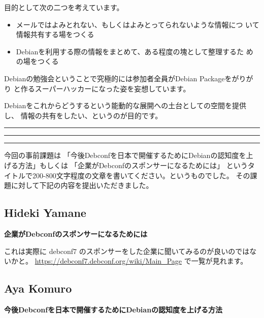 \documentclass[mingoth,a4paper]{jsarticle}
\begin{document}
 目的として次の二つを考えています。

 \begin{itemize}
 \item メールではよみとれない、もしくはよみとってられないような情報につ
       いて情報共有する場をつくる
 \item Debianを利用する際の情報をまとめて、ある程度の塊として整理するた
       めの場をつくる
 \end{itemize}

 Debianの勉強会ということで究極的には参加者全員がDebian Packageをがりがり
 と作るスーパーハッカーになった姿を妄想しています。

 Debianをこれからどうするという能動的な展開への土台としての空間を提供し、
 情報の共有をしたい、というのが目的です。


\newpage

\begin{minipage}[b]{0.2\hsize}
 \colorbox{dancerlightblue}{}
\end{minipage}
\begin{minipage}[b]{0.8\hsize}
\hrule
\vspace{2mm}
\hrule
\tableofcontents
\vspace{2mm}
\hrule
\end{minipage}


今回の事前課題は
「今後Debconfを日本で開催するためにDebianの認知度を上げる方法」もしくは
「企業がDebconfのスポンサーになるためには」
というタイトルで200-800文字程度の文章を書いてください。というものでした。
その課題に対して下記の内容を提出いただきました。

\subsection{Hideki Yamane}

\textbf{企業がDebconfのスポンサーになるためには}

これは実際に debconf7 のスポンサーをした企業に聞いてみるのが良いのではないかと。
\url{https://debconf7.debconf.org/wiki/Main_Page} で一覧が見れます。


\subsection{Aya Komuro}


\textbf{今後Debconfを日本で開催するためにDebianの認知度を上げる方法}
\end{document}
